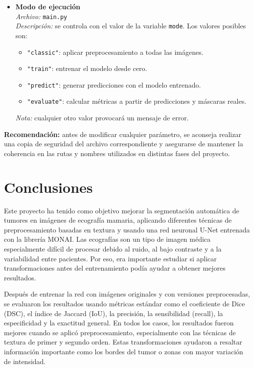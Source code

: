 \documentclass[12pt]{article}
\begin{document}
\begin{itemize}
    \item \textbf{Modo de ejecución} \\
    \textit{Archivo:} \texttt{main.py} \\
    \textit{Descripción:} se controla con el valor de la variable \texttt{mode}. Los valores posibles son:
    \begin{itemize}
        \item \texttt{"classic"}: aplicar preprocesamiento a todas las imágenes.
        \item \texttt{"train"}: entrenar el modelo desde cero.
        \item \texttt{"predict"}: generar predicciones con el modelo entrenado.
        \item \texttt{"evaluate"}: calcular métricas a partir de predicciones y máscaras reales.
    \end{itemize}
    \textit{Nota:} cualquier otro valor provocará un mensaje de error.
\end{itemize}

\textbf{Recomendación:} antes de modificar cualquier parámetro, se aconseja realizar una copia de seguridad del archivo correspondiente y asegurarse de mantener la coherencia en las rutas y nombres utilizados en distintas fases del proyecto.

\section{Conclusiones}

Este proyecto ha tenido como objetivo mejorar la segmentación automática de tumores en imágenes de ecografía mamaria, aplicando diferentes técnicas de preprocesamiento basadas en textura y usando una red neuronal U-Net entrenada con la librería MONAI. Las ecografías son un tipo de imagen médica especialmente difícil de procesar debido al ruido, al bajo contraste y a la variabilidad entre pacientes. Por eso, era importante estudiar si aplicar transformaciones antes del entrenamiento podía ayudar a obtener mejores resultados.

Después de entrenar la red con imágenes originales y con versiones preprocesadas, se evaluaron los resultados usando métricas estándar como el coeficiente de Dice (DSC), el índice de Jaccard (IoU), la precisión, la sensibilidad (recall), la especificidad y la exactitud general. En todos los casos, los resultados fueron mejores cuando se aplicó preprocesamiento, especialmente con las técnicas de textura de primer y segundo orden. Estas transformaciones ayudaron a resaltar información importante como los bordes del tumor o zonas con mayor variación de intensidad.
\end{document}
